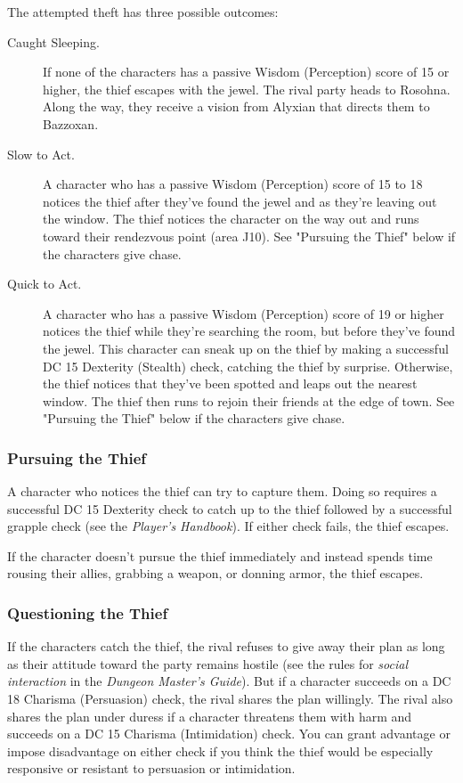 \documentclass[10pt,a4paper,twoside,bg=print,twocolumn,openany,nodeprecatedcode]{dndbook}
\begin{document}
The attempted theft has three possible outcomes:


\begin{description}
\item[Caught Sleeping.]
If none of the characters has a passive Wisdom (Perception) score of 15 or higher, the thief escapes with the jewel. The rival party heads to Rosohna. Along the way, they receive a vision from Alyxian that directs them to Bazzoxan.
\item[Slow to Act.]
A character who has a passive Wisdom (Perception) score of 15 to 18 notices the thief after they've found the jewel and as they're leaving out the window. The thief notices the character on the way out and runs toward their rendezvous point (area J10). See "Pursuing the Thief" below if the characters give chase.
\item[Quick to Act.]
A character who has a passive Wisdom (Perception) score of 19 or higher notices the thief while they're searching the room, but before they've found the jewel. This character can sneak up on the thief by making a successful DC 15 Dexterity (Stealth) check, catching the thief by surprise. Otherwise, the thief notices that they've been spotted and leaps out the nearest window. The thief then runs to rejoin their friends at the edge of town. See "Pursuing the Thief" below if the characters give chase.
\end{description}

\subsubsection{Pursuing the Thief}
A character who notices the thief can try to capture them. Doing so requires a successful DC 15 Dexterity check to catch up to the thief followed by a successful grapple check (see the \textit{Player's Handbook}). If either check fails, the thief escapes.

If the character doesn't pursue the thief immediately and instead spends time rousing their allies, grabbing a weapon, or donning armor, the thief escapes.

\subsubsection{Questioning the Thief}
If the characters catch the thief, the rival refuses to give away their plan as long as their attitude toward the party remains hostile (see the rules for \textit{social interaction} in the \textit{Dungeon Master's Guide}). But if a character succeeds on a DC 18 Charisma (Persuasion) check, the rival shares the plan willingly. The rival also shares the plan under duress if a character threatens them with harm and succeeds on a DC 15 Charisma (Intimidation) check. You can grant advantage or impose disadvantage on either check if you think the thief would be especially responsive or resistant to persuasion or intimidation.
\end{document}
